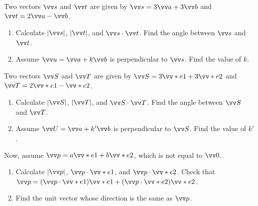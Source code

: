 \documentclass[11pt,pdfa,lastpage]{MishoNote}
\begin{document}
\begin{problems}
 Two vectors $\vc s$ and $\vc t$ are given by $\vc s=3\vc a+3\vc b$ and $\vc t=2\vc a-\vc b$.
  \begin{enumerate}
    \item Calculate $|\vc s|$, $|\vc t|$, and $\vc s\cdot\vc t$. Find the angle between $\vc s$ and $\vc t$.
    \item Assume $\vc u=\vc a+k\vc b$ is perpendicular to $\vc s$. Find the value of $k$.
  \end{enumerate}
  Two vectors $\vc S$ and $\vc T$ are given by $\vc S=3\vc e_1+3\vc e_2$ and $\vc T=2\vc e_1-\vc e_2$.
  \begin{enumerate}[resume]
    \item Calculate $|\vc S|$, $|\vc T|$, and $\vc S\cdot\vc T$. Find the angle between $\vc S$ and $\vc T$.
    \item Assume $\vc U=\vc a+k'\vc b$ is perpendicular to $\vc S$. Find the value of $k'$.
  \end{enumerate}
  Now, assume $\vc p=a\vc e_1+b\vc e_2$, which is not equal to $\vc 0$.
  \begin{enumerate}[resume]
    \item Calculate $|\vc p|$, $\vc p\cdot\vc e_1$, and $\vc p\cdot\vc e_2$. Check that $\vc p=(\vc p\cdot\vc e_1)\vc e_1+(\vc p\cdot\vc e_2)\vc e_2$.
    \item Find the unit vector whose direction is the same as $\vc p$.
  \end{enumerate}
\end{problems}
\end{document}

